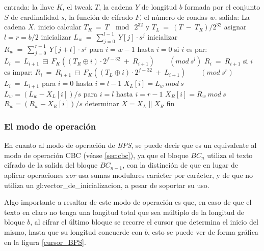 \begin{pseudocodigo}[caption={Proceso de descifrado $BC^{-1}$.},
label={descifrado_BC}]
    entrada:    la llave $K$,
                el tweak $T$,
                la cadena $Y$ de longitud $b$ formada por el conjunto $S$
                  de cardinalidad $s$,
                la función de cifrado $F$,
                el número de rondas $w$.
    salida:     La cadena $X$.
    inicio
      calcular $T_R\: =\: T\: \mod\: 2^{32}$ y $T_L\: =\: (T\: -\: T_R) / 2^{32}$
      asignar $l = r = b/2$
      inicializar $L_w\: =\: \sum_{j=0}^{l-1}\: Y[j] \cdot s^j$
      inicializar $R_w\: =\: \sum_{j=0}^{r-1}\: Y[j+l] \cdot s^j$
      para $i=w-1$ hasta $i=0$
      si $i$ es par:
        $L_i\: =\: L_{i+1}\: \boxminus\: F_K((T_R \oplus i) \cdot 2^{f-32}\: +\: R_{i+1})\qquad (mod\ s^l)$
        $R_i\: =\: R_{i+1}$
      si $i$ es impar:
        $R_i\: =\: R_{i+1}\: \boxminus\: F_K((T_L \oplus i) \cdot 2^{f-32}\: +\: L_{i+1})\qquad (mod\ s^r)$
        $L_i\: =\: L_{i+1}$
      para $i=0$ hasta $i=l-1$
        $X_L[i] = L_w\ mod\ s$
        $L_w = (L_w - X_L[i])/s$
      para $i=l$ hasta $i=r-1$
        $X_R[i] = R_w\ mod\ s$
        $R_w = (R_w - X_R[i])/s$
      determinar $X = X_L \parallel X_R$
    fin
\end{pseudocodigo}


\subsubsection{El modo de operación}
\label{sec:bps_modo_operacion}

En cuanto al modo de operación de \textit{BPS}, se puede decir que es un
equivalente al modo de operación CBC (véase \ref{sec:cbc}), ya que el bloque
$BC_n$ utiliza el texto cifrado de la salida del bloque $BC_{n-1}$, con la
distinción de que en lugar de aplicar operaciones \textit{xor} usa sumas
modulares carácter por carácter, y de que no utiliza un
\gls{gl:vector_de_inicializacion}, a pesar de soportar su uso.

Algo importante a resaltar de este modo de operación es que, en caso de que el
texto en claro no tenga una longitud total que sea múltiplo de la longitud de
bloque $b$, al cifrar el último bloque se recorre el cursor que determina
el inicio del mismo, hasta que su longitud concuerde con $b$, esto se puede
ver de forma gráfica en la figura \ref{cursor_BPS}.

